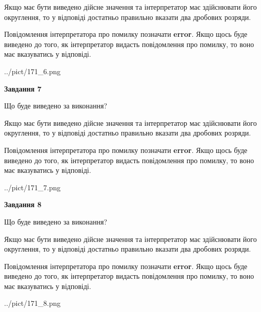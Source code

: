 \documentclass[12pt, ukrainian]{article}
\begin{document}
{\begin {Large}
Якщо має бути виведено дійсне значення та інтерпретатор має здійснювати його округлення, 
то у відповіді достатньо правильно вказати два дробових розряди.

Повідомлення інтерпретатора про помилку позначати \textbf{error}.
Якщо щось буде виведено до того, як інтерпретатор видасть повідомлення про помилку, 
то воно має вказуватись у відповіді. \par

\begin{center}
	{../pict/171_6.png}
\end{center}
\newpage

{\begin {center}\textbf{Завдання 7}\end {center}}\par
Що буде виведено за виконання? \par

Якщо має бути виведено дійсне значення та інтерпретатор має здійснювати його округлення, 
то у відповіді достатньо правильно вказати два дробових розряди.

Повідомлення інтерпретатора про помилку позначати \textbf{error}.
Якщо щось буде виведено до того, як інтерпретатор видасть повідомлення про помилку, 
то воно має вказуватись у відповіді. \par

\begin{center}
	{../pict/171_7.png}
\end{center}
\newpage

{\begin {center}\textbf{Завдання 8}\end {center}}\par
Що буде виведено за виконання? \par

Якщо має бути виведено дійсне значення та інтерпретатор має здійснювати його округлення, 
то у відповіді достатньо правильно вказати два дробових розряди.

Повідомлення інтерпретатора про помилку позначати \textbf{error}.
Якщо щось буде виведено до того, як інтерпретатор видасть повідомлення про помилку, 
то воно має вказуватись у відповіді. \par

\begin{center}
	{../pict/171_8.png}
\end{center}
\newpage


\end{Large}}
\end{document}
